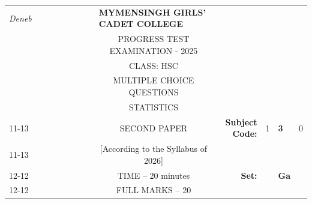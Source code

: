 \documentclass[12pt]{exam}
\begin{document}
\begin{table}[]
\begin{tabular}{llllllllcllll}
\textit{Deneb} &  &  &  &  &  &  &  & \multicolumn{1}{l}{\textbf{MYMENSINGH GIRLS' CADET COLLEGE}} &                                             &                        &                                 &                        \\
                &  &  &  &  &  &  &  & \multicolumn{1}{c}{PROGRESS TEST EXAMINATION - 2025}       &                                             &                        & \multicolumn{1}{c}{}            &                        \\
                &  &  &  &  &  &  &  & CLASS: HSC                                                   &                                             &                        & \multicolumn{1}{c}{}            &                        \\
                &  &  &  &  &  &  &  & MULTIPLE CHOICE QUESTIONS                                    &                                             &                        & \multicolumn{1}{c}{}            &                        \\
                &  &  &  &  &  &  &  & STATISTICS                                                   &                                             &                        & \multicolumn{1}{r}{}            &                        \\ \cline{11-13} 
                &  &  &  &  &  &  &  & SECOND PAPER                                                 & \multicolumn{1}{r|}{\textbf{Subject Code:}} & \multicolumn{1}{l|}{1} & \multicolumn{1}{l|}{\textbf{3}} & \multicolumn{1}{l|}{0} \\ \cline{11-13} 
                &  &  &  &  &  &  &  & [According to the Syllabus of 2026]                          & \multicolumn{1}{r}{}                        &                        &                                 &                        \\ \cline{12-12}
                &  &  &  &  &  &  &  & TIME – 20 minutes                                            & \multicolumn{1}{r}{\textbf{Set:}}           & \multicolumn{1}{l|}{}  & \multicolumn{1}{l|}{\textbf{Ga}} &                        \\ \cline{12-12}
                &  &  &  &  &  &  &  & FULL MARKS – 20                                              &                                             &                        &                                 &                       
\end{tabular}
\end{table}
\end{document}
